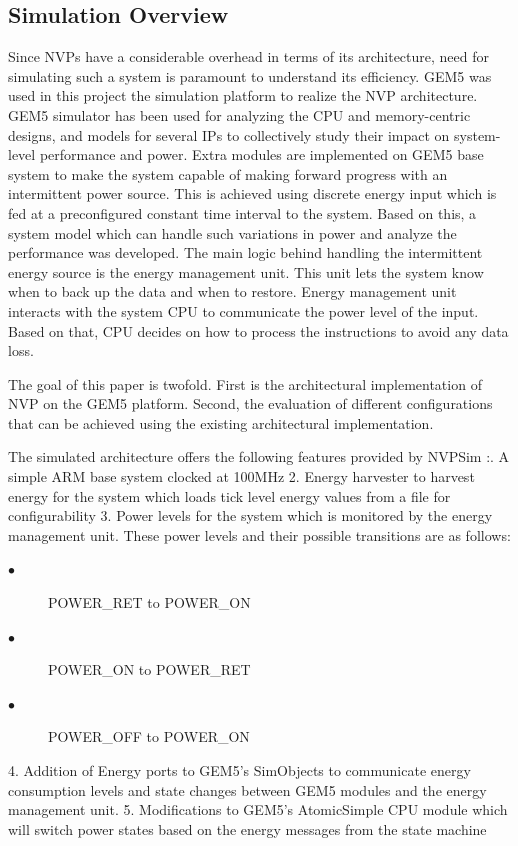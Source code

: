 \documentclass[conference]{IEEEtran}
\begin{document}
 \subsection{Simulation Overview}
 Since NVPs have a considerable overhead in terms of its architecture, need for simulating such a system is paramount to understand its efficiency. GEM5 was used in this project the simulation platform to realize the NVP architecture. GEM5 simulator has been used for analyzing the CPU and memory-centric designs, and models for several IPs to collectively study their impact on system-level performance and power. Extra modules are implemented on GEM5 base system to make the system capable of making forward progress with an intermittent power source. This is achieved using discrete energy input which is fed at a preconfigured constant time interval to the system. Based on this, a system model which can handle such variations in power and analyze the performance was developed. The main logic behind handling the intermittent energy source is the energy management unit. This unit lets the system know when to back up the data and when to restore. Energy management unit interacts with the system CPU to communicate the power level of the input. Based on that, CPU decides on how to process the instructions to avoid any data loss.
 
\vspace{5 mm}

The goal of this paper is twofold. First is the architectural implementation of NVP on the GEM5 platform. Second, the evaluation of different configurations that can be achieved using the existing architectural implementation. 
\vspace{5 mm}

The simulated architecture offers the following features provided by NVPSim \cite{b1}:. A simple ARM base system clocked at 100MHz
2. Energy harvester to harvest energy for the system which loads tick level energy values from a file for configurability
3. Power levels for the system which is monitored by the energy management unit. These power levels and their possible transitions are as follows:
\begin{description}
  \item[$\bullet$] POWER\_RET to POWER\_ON
  \item[$\bullet$] POWER\_ON to POWER\_RET
  \item[$\bullet$] POWER\_OFF to POWER\_ON
\end{description}
4. Addition of Energy ports to GEM5's SimObjects to communicate energy consumption levels and state changes between GEM5 modules and the energy management unit.
5. Modifications to GEM5's AtomicSimple CPU module which will switch power states based on the energy messages from the state machine
\end{document}
